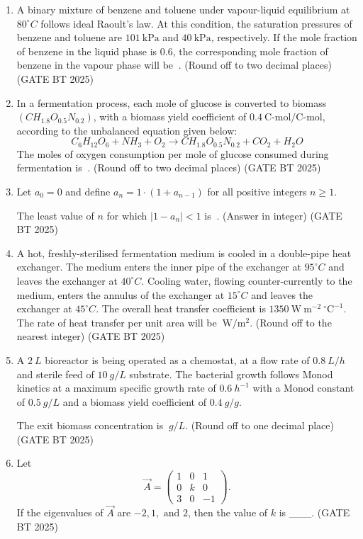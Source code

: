 \documentclass[journal,12pt,onecolumn]{IEEEtran}
\theoremstyle{remark}
\begin{document}
\begin{enumerate}
\item A binary mixture of benzene and toluene under vapour-liquid equilibrium at $80^\circ C$ follows ideal Raoult's law. At this condition, the saturation pressures of benzene and toluene are $101\ \text{kPa}$ and $40\ \text{kPa}$, respectively. If the mole fraction of benzene in the liquid phase is $0.6$, the corresponding mole fraction of benzene in the vapour phase will be $~$. (Round off to two decimal places)
\hfill (GATE BT 2025)

\item In a fermentation process, each mole of glucose is converted to biomass $(CH_{1.8}O_{0.5}N_{0.2})$, with a biomass yield coefficient of $0.4\ \text{C-mol/C-mol}$, according to the unbalanced equation given below:
\[
C_6H_{12}O_6 + NH_3 + O_2 \rightarrow CH_{1.8}O_{0.5}N_{0.2} + CO_2 + H_2O
\]
The moles of oxygen consumption per mole of glucose consumed during fermentation is $~$. (Round off to two decimal places)
\hfill (GATE BT 2025)

\item Let $a_0 = 0$ and define $a_n = 1 \cdot (1 + a_{n-1})$ for all positive integers $n \ge 1$.  

The least value of $n$ for which $|1 - a_n| < 1$ is $~$. (Answer in integer)  
\hfill (GATE BT 2025)

\item A hot, freshly-sterilised fermentation medium is cooled in a double-pipe heat exchanger. The medium enters the inner pipe of the exchanger at $95^\circ C$ and leaves the exchanger at $40^\circ C$. Cooling water, flowing counter-currently to the medium, enters the annulus of the exchanger at $15^\circ C$ and leaves the exchanger at $45^\circ C$. The overall heat transfer coefficient is $1350\ \mathrm{W\ m^{-2}\ ^\circ C^{-1}}$. The rate of heat transfer per unit area will be $~\mathrm{W/m^2}$. (Round off to the nearest integer)  
\hfill (GATE BT 2025)

\item A $2\ L$ bioreactor is being operated as a chemostat, at a flow rate of $0.8\ L/h$ and sterile feed of $10\ g/L$ substrate. The bacterial growth follows Monod kinetics at a maximum specific growth rate of $0.6\ h^{-1}$ with a Monod constant of $0.5\ g/L$ and a biomass yield coefficient of $0.4\ g/g$.  

The exit biomass concentration is $~g/L$. (Round off to one decimal place)  
\hfill (GATE BT 2025)

\item Let 
\[
\vec{A} = \begin{pmatrix}
1 & 0 & 1 \\
0 & k & 0 \\
3 & 0 & -1
\end{pmatrix}.
\] 
If the eigenvalues of \(\vec{A}\) are \(-2, 1, \text{ and } 2\), then the value of \(k\) is \_\_\_.  
\hfill (GATE BT 2025)


\end{enumerate}
\end{document}
